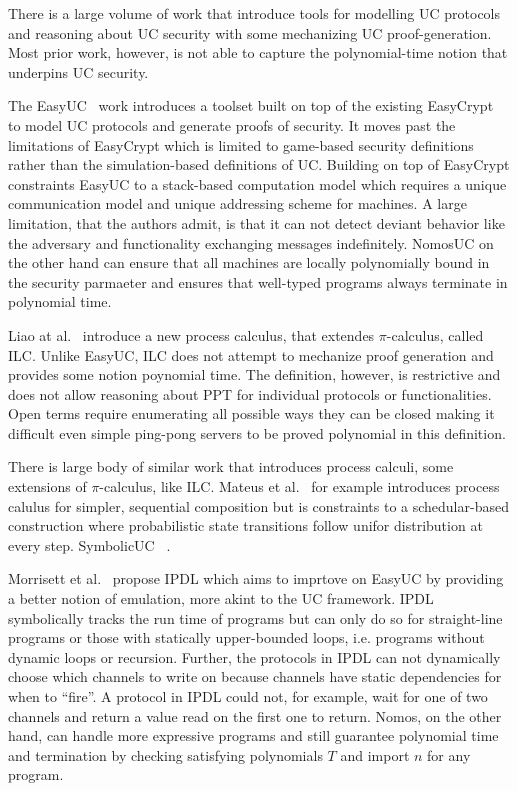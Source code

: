 There is a large volume of work that introduce tools for modelling UC protocols and reasoning about UC security with some mechanizing UC proof-generation.
Most prior work, however, is not able to capture the polynomial-time notion that underpins UC security.

The EasyUC~\cite{easyuc} work introduces a toolset built on top of the existing EasyCrypt~\cite{easycrypt} to model UC protocols and generate proofs of security.
It moves past the limitations of EasyCrypt which is limited to game-based security definitions rather than the simulation-based definitions of UC.
Building on top of EasyCrypt constraints EasyUC to a stack-based computation model which requires a unique communication model and unique addressing scheme for machines.
A large limitation, that the authors admit, is that it can not detect deviant behavior like the adversary and functionality exchanging messages indefinitely.
NomosUC on the other hand can ensure that all machines are locally polynomially bound in the security parmaeter and ensures that well-typed programs always terminate in polynomial time.

Liao at al.~\cite{ilc} introduce a new process calculus, that extendes $\pi$-calculus, called ILC.
Unlike EasyUC, ILC does not attempt to mechanize proof generation and provides some notion poynomial time.
The definition, however, is restrictive and does not allow reasoning about PPT for individual protocols or functionalities.
Open terms require enumerating all possible ways they can be closed making it difficult even simple ping-pong servers to be proved polynomial in this definition.

There is large body of similar work that introduces process calculi, some extensions of $\pi$-calculus, like ILC.
Mateus et al.~\cite{mateus} for example introduces process calulus for simpler, sequential composition but is constraints to a schedular-based construction where probabilistic state transitions follow unifor distribution at every step.
SymbolicUC~\cite{symbolicuc} .

Morrisett et al.~\cite{ipdl} propose IPDL which aims to imprtove on EasyUC by providing a better notion of emulation, more akint to the UC framework.
IPDL symbolically tracks the run time of programs but can only do so for straight-line programs or those with statically upper-bounded loops, i.e. programs without dynamic loops or recursion. 
Further, the protocols in IPDL can not dynamically choose which channels to write on because channels have static dependencies for when to ``fire''. 
A protocol in IPDL could not, for example, wait for one of two channels and return a value read on the first one to return. 
Nomos, on the other hand, can handle more expressive programs and still guarantee polynomial time and termination by checking satisfying polynomials $T$ and import $n$ for any program.

